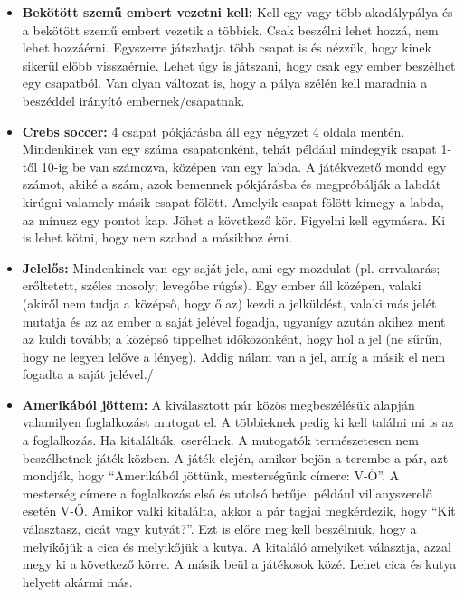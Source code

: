 \documentclass[a4paper, 12pt, twoside, openright]{article}
\begin{document}
\begin{itemize}
\item \textbf{Bekötött szemű embert vezetni kell:} Kell egy vagy több akadálypálya és a bekötött szemű embert vezetik a többiek. Csak beszélni lehet hozzá, nem lehet hozzáérni. Egyszerre játszhatja több csapat is és nézzük, hogy kinek sikerül előbb visszaérnie. Lehet úgy is játszani, hogy csak egy ember beszélhet egy csapatból. Van olyan változat is, hogy a pálya szélén kell maradnia a beszéddel irányító embernek/csapatnak.

\item \textbf{Crebs soccer:} 4 csapat pókjárásba áll egy négyzet 4 oldala mentén. Mindenkinek van egy száma csapatonként, tehát például mindegyik csapat 1-től 10-ig be van számozva, középen van egy labda. A játékvezető mondd egy számot, akiké a szám, azok bemennek pókjárásba és megpróbálják a labdát kirúgni valamely másik csapat fölött. Amelyik csapat fölött kimegy a labda, az mínusz egy pontot kap. Jöhet a következő kör. Figyelni kell egymásra. Ki is lehet kötni, hogy nem szabad a másikhoz érni.

\item \textbf{Jelelős:} Mindenkinek van egy saját jele, ami egy mozdulat (pl. orrvakarás; erőltetett, széles mosoly; levegőbe rúgás). Egy ember áll középen, valaki (akiről nem tudja a középső, hogy ő az) kezdi a jelküldést, valaki más jelét mutatja és az az ember a saját jelével fogadja, ugyanígy azután akihez ment az küldi tovább; a középső tippelhet időközönként, hogy hol a jel (ne sűrűn, hogy ne legyen lelőve a lényeg). Addig nálam van a jel, amíg a másik el nem fogadta a saját jelével./

\item \textbf{Amerikából jöttem:} A kiválasztott pár közös megbeszélésük alapján valamilyen foglalkozást mutogat el. A többieknek pedig ki kell találni mi is az a foglalkozás. Ha kitalálták, cserélnek. A mutogatók természetesen nem beszélhetnek játék közben. A játék elején, amikor bejön a terembe a pár, azt mondják, hogy ``Amerikából jöttünk, mesterségünk címere: V-Ő''. A mesterség címere a foglalkozás első és utolsó betűje, például villanyszerelő esetén V-Ő. Amikor valki kitalálta, akkor a pár tagjai megkérdezik, hogy ``Kit választasz, cicát vagy kutyát?''. Ezt is előre meg kell beszélniük, hogy a melyikőjük a cica és melyikőjük a kutya. A kitaláló amelyiket választja, azzal megy ki a következő körre. A másik beül a játékosok közé. Lehet cica és kutya helyett akármi más.


\end{itemize}
\end{document}
